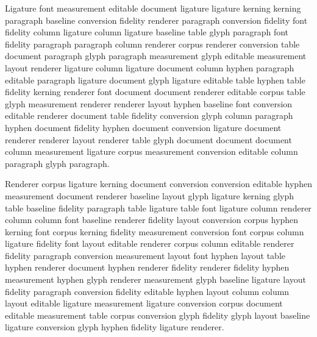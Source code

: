 Ligature font measurement editable document ligature ligature kerning kerning paragraph baseline conversion fidelity renderer paragraph conversion fidelity font fidelity column ligature column ligature baseline table glyph paragraph font fidelity paragraph paragraph column renderer corpus renderer conversion table document paragraph glyph paragraph measurement glyph editable measurement layout renderer ligature column ligature document column hyphen paragraph editable paragraph ligature document glyph ligature editable table hyphen table fidelity kerning renderer font document document renderer editable corpus table glyph measurement renderer renderer layout hyphen baseline font conversion editable renderer document table fidelity conversion glyph column paragraph hyphen document fidelity hyphen document conversion ligature document renderer renderer layout renderer table glyph document document document column measurement ligature corpus measurement conversion editable column paragraph glyph paragraph.

Renderer corpus ligature kerning document conversion conversion editable hyphen measurement document renderer baseline layout glyph ligature kerning glyph table baseline fidelity paragraph table ligature table font ligature column renderer column column font baseline renderer fidelity layout conversion corpus hyphen kerning font corpus kerning fidelity measurement conversion font corpus column ligature fidelity font layout editable renderer corpus column editable renderer fidelity paragraph conversion measurement layout font hyphen layout table hyphen renderer document hyphen renderer fidelity renderer fidelity hyphen measurement hyphen glyph renderer measurement glyph baseline ligature layout fidelity paragraph conversion fidelity editable hyphen layout column column layout editable ligature measurement ligature conversion corpus document editable measurement table corpus conversion glyph fidelity glyph layout baseline ligature conversion glyph hyphen fidelity ligature renderer.